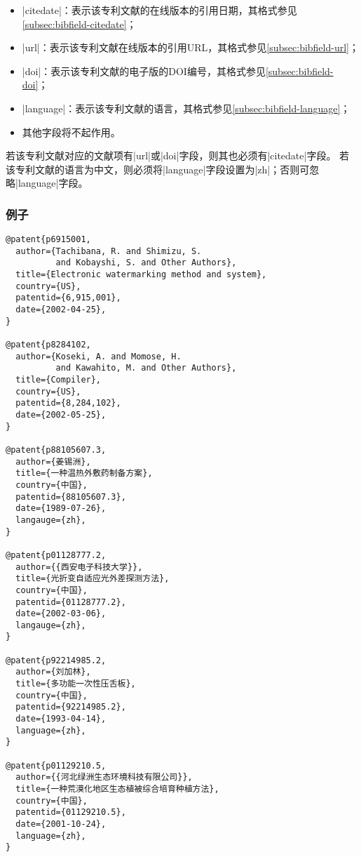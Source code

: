 \begin{itemize}
\item |citedate|：表示该专利文献的在线版本的引用日期，其格式参见\ref{subsec:bibfield-citedate}；
\item |url|：表示该专利文献在线版本的引用URL，其格式参见\ref{subsec:bibfield-url}；
\item |doi|：表示该专利文献的电子版的DOI编号，其格式参见\ref{subsec:bibfield-doi}；
\item |language|：表示该专利文献的语言，其格式参见\ref{subsec:bibfield-language}；
\item 其他字段将不起作用。
\end{itemize}

\begin{note}
若该专利文献对应的文献项有|url|或|doi|字段，则其也必须有|citedate|字段。
若该专利文献的语言为中文，则必须将|language|字段设置为|zh|；否则可忽略|language|字段。
\end{note}

\subsubsection{例子}

\begin{verbatim}
@patent{p6915001,
  author={Tachibana, R. and Shimizu, S. 
          and Kobayshi, S. and Other Authors},
  title={Electronic watermarking method and system},
  country={US},
  patentid={6,915,001},
  date={2002-04-25},
}

@patent{p8284102,
  author={Koseki, A. and Momose, H. 
          and Kawahito, M. and Other Authors},
  title={Compiler},
  country={US},
  patentid={8,284,102},
  date={2002-05-25},
}

@patent{p88105607.3,
  author={姜锡洲},
  title={一种温热外敷药制备方案},
  country={中国},
  patentid={88105607.3},
  date={1989-07-26},
  langauge={zh},
}

@patent{p01128777.2,
  author={{西安电子科技大学}},
  title={光折变自适应光外差探测方法},
  country={中国},
  patentid={01128777.2},
  date={2002-03-06},
  langauge={zh},
}

@patent{p92214985.2,
  author={刘加林},
  title={多功能一次性压舌板},
  country={中国},
  patentid={92214985.2},
  date={1993-04-14},
  language={zh},
}

@patent{p01129210.5,
  author={{河北绿洲生态环境科技有限公司}},
  title={一种荒漠化地区生态植被综合培育种植方法},
  country={中国},
  patentid={01129210.5},
  date={2001-10-24},
  language={zh},
}
\end{verbatim}

